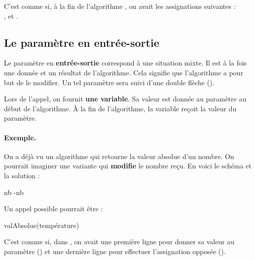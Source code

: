 		C'est comme si,
		à la fin de l'algorithme ,
		on avait les assignations suivantes :
		\\,  et .
				
	\subsection{Le paramètre en entrée-sortie}

		Le paramètre en \textbf{entrée-sortie}
		correspond à une situation mixte.
		Il est à la fois une donnée et un résultat de l'algorithme.
		Cela signifie que l'algorithme a pour but de le modifier.
		Un tel paramètre sera suivi d'une double flèche (\In\Out).
		
		Lors de l'appel, on fournit \textbf{une variable}.
		Sa valeur est donnée au paramètre au début de l'algorithme.
		À la fin de l'algorithme, la variable reçoit la valeur du paramètre.
		
		\paragraph{Exemple.}
		On a déjà vu un algorithme qui retourne la valeur absolue d'un nombre.
		On pourrait imaginer une variante qui \textbf{modifie}
		le nombre reçu.
		En voici le schéma et la solution :

		\begin{minipage}{6cm}		
			\begin{center}
			\end{center}
		\end{minipage}
		\quad
		\begin{minipage}{6cm}		
			\begin{LDA}
						\Let nb \Gets -nb
					\EndIf
				\EndAlgo
			\end{LDA}
		\end{minipage}
		
		Un appel possible pourrait être :

		\begin{LDA}
			\Stmt valAbsolue(température)
		\end{LDA}
	
		C'est comme si, dans ,
		on avait une première ligne pour donner sa valeur au paramètre
		()
		et une dernière ligne pour effectuer l'assignation opposée
		().
		
